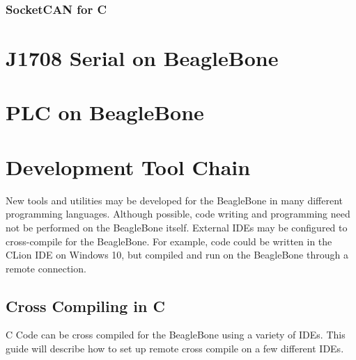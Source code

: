         \subsubsection{SocketCAN for C}

        
\section{J1708 Serial on BeagleBone}

\section{PLC on BeagleBone}

\section{Development Tool Chain}
    New tools and utilities may be developed for the BeagleBone in many different programming languages. Although possible, code writing and programming need not be performed on the BeagleBone itself. External IDEs may be configured to cross-compile for the BeagleBone. For example, code could be written in the CLion IDE on Windows 10, but compiled and run on the BeagleBone through a remote connection. 
    \subsection{Cross Compiling in C}
        C Code can be cross compiled for the BeagleBone using a variety of IDEs. This guide will describe how to set up remote cross compile on a few different IDEs. 
